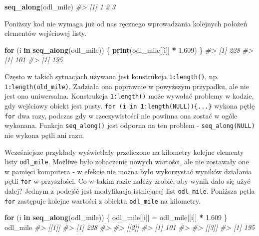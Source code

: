 \documentclass[paper=6in:9in,pagesize=pdftex,headinclude=on,footinclude=on,10pt]{scrbook}
\newenvironment{Shaded}{\begin{snugshade}}{\end{snugshade}}
\newcommand{\CommentTok}[1]{\textcolor[rgb]{0.56,0.35,0.01}{\textit{#1}}}
\newcommand{\ControlFlowTok}[1]{\textcolor[rgb]{0.13,0.29,0.53}{\textbf{#1}}}
\newcommand{\FloatTok}[1]{\textcolor[rgb]{0.00,0.00,0.81}{#1}}
\newcommand{\KeywordTok}[1]{\textcolor[rgb]{0.13,0.29,0.53}{\textbf{#1}}}
\newcommand{\NormalTok}[1]{#1}
\newcommand{\OperatorTok}[1]{\textcolor[rgb]{0.81,0.36,0.00}{\textbf{#1}}}
\newcommand{\StringTok}[1]{\textcolor[rgb]{0.31,0.60,0.02}{#1}}
\let\BeginKnitrBlock\begin \let\EndKnitrBlock\end
\begin{document}
\begin{Shaded}
\begin{Highlighting}[]
\KeywordTok{seq_along}\NormalTok{(odl_mile)}
\CommentTok{#> [1] 1 2 3}
\end{Highlighting}
\end{Shaded}

Poniższy kod nie wymaga już od nas ręcznego wprowadzania kolejnych położeń elementów wejściowej listy.

\begin{Shaded}
\begin{Highlighting}[]
\ControlFlowTok{for}\NormalTok{ (i }\ControlFlowTok{in} \KeywordTok{seq_along}\NormalTok{(odl_mile)) \{}
  \KeywordTok{print}\NormalTok{(odl_mile[[i]] }\OperatorTok{*}\StringTok{ }\FloatTok{1.609}\NormalTok{)}
\NormalTok{\}}
\CommentTok{#> [1] 228}
\CommentTok{#> [1] 101}
\CommentTok{#> [1] 195}
\end{Highlighting}
\end{Shaded}

\BeginKnitrBlock{rmdinfo}
Często w takich sytuacjach używana jest konstrukcja \texttt{1:length()}, np. \texttt{1:length(old\_mile)}.
Zadziała ona poprawnie w powyższym przypadku, ale nie jest ona uniwersalna.
Konstrukcja \texttt{1:length()} może wywołać problemy w kodzie, gdy wejściowy obiekt jest pusty.
\texttt{for\ (i\ in\ 1:length(NULL))\{...\}} wykona pętlę \texttt{for} dwa razy, podczas gdy w rzeczywistości nie powinna ona zostać w ogóle wykonana.
Funkcja \texttt{seq\_along()} jest odporna na ten problem - \texttt{seq\_along(NULL)} nie wykona pętli ani razu.
\EndKnitrBlock{rmdinfo}

Wcześniejsze przykłady wyświetlały przeliczone na kilometry kolejne elementy listy \texttt{odl\_mile}.
Możliwe było zobaczenie nowych wartości, ale nie zostawały one w pamięci komputera - w efekcie nie można było wykorzystać wyników działania pętli \texttt{for} w przyszłości.
Co w takim razie należy zrobić, aby wynik dało się użyć dalej?
Jednym z podejść jest modyfikacja istniejącej list \texttt{odl\_mile}.
Poniższa pętla \texttt{for} zastępuje kolejne wartości z obiektu \texttt{odl\_mile} na kilometry.

\begin{Shaded}
\begin{Highlighting}[]
\ControlFlowTok{for}\NormalTok{ (i }\ControlFlowTok{in} \KeywordTok{seq_along}\NormalTok{(odl_mile)) \{}
\NormalTok{  odl_mile[[i]] =}\StringTok{ }\NormalTok{odl_mile[[i]] }\OperatorTok{*}\StringTok{ }\FloatTok{1.609}
\NormalTok{\}}
\NormalTok{odl_mile}
\CommentTok{#> [[1]]}
\CommentTok{#> [1] 228}
\CommentTok{#> }
\CommentTok{#> [[2]]}
\CommentTok{#> [1] 101}
\CommentTok{#> }
\CommentTok{#> [[3]]}
\CommentTok{#> [1] 195}
\end{Highlighting}
\end{Shaded}
\end{document}
